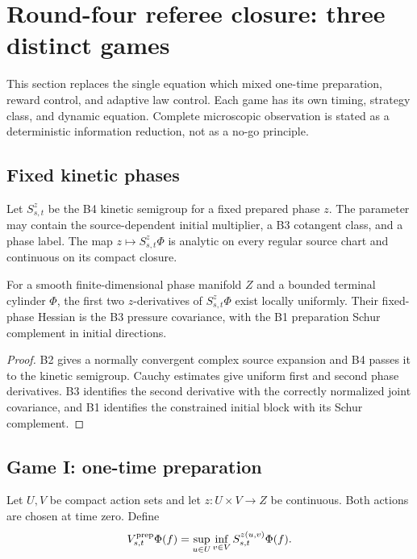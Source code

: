\section{Round-four referee closure: three distinct games}
\label{sec:r3-c1}

This section replaces the single equation which mixed one-time preparation,
reward control, and adaptive law control.  Each game has its own timing,
strategy class, and dynamic equation.  Complete microscopic observation is
stated as a deterministic information reduction, not as a no-go principle.

\subsection{Fixed kinetic phases}

Let \(S_{s,t}^z\) be the B4 kinetic semigroup for a fixed prepared phase
\(z\).  The parameter may contain the source-dependent initial multiplier,
a B3 cotangent class, and a phase label.  The map \(z\mapsto S_{s,t}^z\Phi\)
is analytic on every regular source chart and continuous on its compact
closure.

\begin{lemma}
\label{lem:r3-c1-phase}
For a smooth finite-dimensional phase manifold \(Z\) and a bounded terminal
cylinder \(\Phi\), the first two \(z\)-derivatives of
\(S_{s,t}^z\Phi\) exist locally uniformly.  Their fixed-phase Hessian is the
B3 pressure covariance, with the B1 preparation Schur complement in initial
directions.
\end{lemma}

\begin{proof}
B2 gives a normally convergent complex source expansion and B4 passes it to
the kinetic semigroup.  Cauchy estimates give uniform first and second phase
derivatives.  B3 identifies the second derivative with the correctly
normalized joint covariance, and B1 identifies the constrained initial block
with its Schur complement.
\end{proof}

\subsection{Game I: one-time preparation}

Let \(U,V\) be compact action sets and let
\(z:U\times V\to Z\) be continuous.  Both actions are chosen at time zero.
Define
\[
 V_{s,t}^{\rm prep}\Phi(f)
 =\sup_{u\in U}\inf_{v\in V}
 S_{s,t}^{z(u,v)}\Phi(f).
\]

